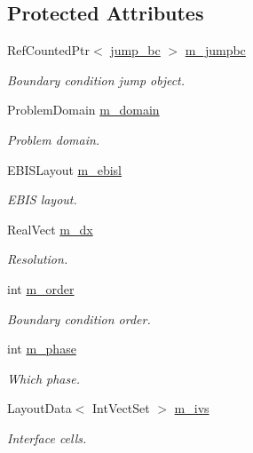 \subsection*{Protected Attributes}
\begin{DoxyCompactItemize}
\item 
Ref\+Counted\+Ptr$<$ \hyperlink{classjump__bc}{jump\+\_\+bc} $>$ \hyperlink{classmfdirichletconductivityebbc_ad0df46438cb38a6db0abb666854a256c}{m\+\_\+jumpbc}
\begin{DoxyCompactList}\small\item\em Boundary condition jump object. \end{DoxyCompactList}\item 
Problem\+Domain \hyperlink{classmfdirichletconductivityebbc_a5f1ec9edc0c756c1cb12988058574ea4}{m\+\_\+domain}
\begin{DoxyCompactList}\small\item\em Problem domain. \end{DoxyCompactList}\item 
E\+B\+I\+S\+Layout \hyperlink{classmfdirichletconductivityebbc_aeb34494a9181822968efb708647d365b}{m\+\_\+ebisl}
\begin{DoxyCompactList}\small\item\em E\+B\+IS layout. \end{DoxyCompactList}\item 
Real\+Vect \hyperlink{classmfdirichletconductivityebbc_abf8b613b943dddd09e7f474c295c624d}{m\+\_\+dx}
\begin{DoxyCompactList}\small\item\em Resolution. \end{DoxyCompactList}\item 
int \hyperlink{classmfdirichletconductivityebbc_a7f14d59fdfe3df089fd969e30caff796}{m\+\_\+order}
\begin{DoxyCompactList}\small\item\em Boundary condition order. \end{DoxyCompactList}\item 
int \hyperlink{classmfdirichletconductivityebbc_a450fa66f967024d39d1779e0cd53bebf}{m\+\_\+phase}
\begin{DoxyCompactList}\small\item\em Which phase. \end{DoxyCompactList}\item 
Layout\+Data$<$ Int\+Vect\+Set $>$ \hyperlink{classmfdirichletconductivityebbc_aa3ccf3355cf102fb3a211b673d913c43}{m\+\_\+ivs}
\begin{DoxyCompactList}\small\item\em Interface cells. \end{DoxyCompactList}\item 

\end{DoxyCompactItemize}
